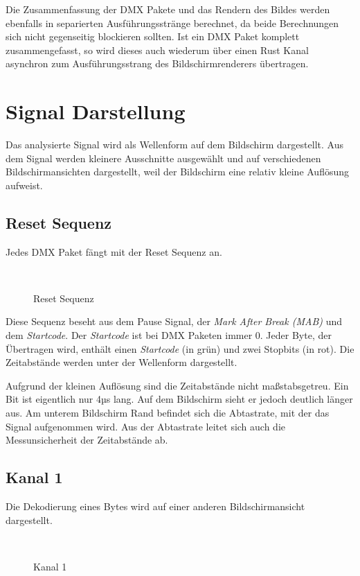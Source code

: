 Die Zusammenfassung der DMX Pakete und das Rendern des Bildes werden ebenfalls in separierten Ausführungsstränge berechnet, da beide Berechnungen sich nicht gegenseitig blockieren sollten. Ist ein DMX Paket komplett zusammengefasst, so wird dieses auch wiederum über einen Rust Kanal asynchron zum Ausführungsstrang des Bildschirmrenderers übertragen.  

\section{Signal Darstellung}
Das analysierte Signal wird als Wellenform auf dem Bildschirm dargestellt.
Aus dem Signal werden kleinere Ausschnitte ausgewählt und auf verschiedenen Bildschirmansichten dargestellt, weil der Bildschirm eine relativ kleine Auflösung aufweist.

\subsection{Reset Sequenz}
Jedes DMX Paket fängt mit der Reset Sequenz an.

\begin{figure}[H]
	\centering
	\\
	\caption{Reset Sequenz}
\end{figure}
Diese Sequenz beseht aus dem Pause Signal, der \emph{Mark After Break (MAB)} und dem \emph{Startcode}. Der \emph{Startcode} ist bei DMX Paketen immer 0. Jeder Byte, der Übertragen wird, enthält einen \emph{Startcode} (in grün) und zwei Stopbits (in rot). Die Zeitabstände werden unter der Wellenform dargestellt.

Aufgrund der kleinen Auflösung sind die Zeitabstände nicht maßstabsgetreu. Ein Bit ist eigentlich nur 4µs lang. Auf dem Bildschirm sieht er jedoch deutlich länger aus. Am unterem Bildschirm Rand befindet sich die Abtastrate, mit der das Signal aufgenommen wird. Aus der Abtastrate leitet sich auch die Messunsicherheit der Zeitabstände ab.

\subsection{Kanal 1}

Die Dekodierung eines Bytes wird auf einer anderen Bildschirmansicht dargestellt.

\begin{figure}[H]
	\centering
	\\
	\caption{Kanal 1}
\end{figure}

